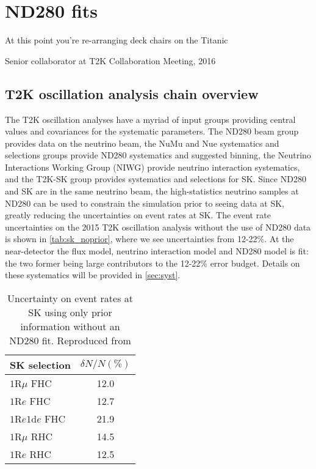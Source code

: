 \chapter{ND280 fits}
\label{chap:ND280}

\epigraph{At this point you're re-arranging deck chairs on the Titanic}{Senior collaborator at T2K Collaboration Meeting, 2016}

\section{T2K oscillation analysis chain overview}
\label{sec:oscchain}
The T2K oscillation analyses have a myriad of input groups providing central values and covariances for the systematic parameters. The ND280 beam group provides data on the neutrino beam, the NuMu and Nue systematics and selections groups provide ND280 systematics and suggested binning, the Neutrino Interactions Working Group (NIWG) provide neutrino interaction systematics, and the T2K-SK group provides systematics and selections for SK. Since ND280 and SK are in the same neutrino beam, the high-statistics neutrino samples at ND280 can be used to constrain the simulation prior to seeing data at SK, greatly reducing the uncertainties on event rates at SK. The event rate uncertainties on the 2015 T2K oscillation analysis without the use of ND280 data is shown in \autoref{tab:sk_noprior}, where we see uncertainties from 12-22\%. At the near-detector the flux model, neutrino interaction model and ND280 model is fit: the two former being large contributors to the 12-22\% error budget. Details on these systematics will be provided in \autoref{sec:syst}. 

\begin{table}[h]
	\begin{tabular}{l | c}
		\hline
		\hline
		SK selection & $\delta N/N (\%)$ \\
		\hline
		$1\text{R}\mu$ FHC & 12.0 \\
		$1\text{R}e$ FHC & 12.7 \\
		$1\text{R}e1\text{d}e$ FHC & 21.9 \\
		\hline
		$1\text{R}\mu$ RHC & 14.5 \\
		$1\text{R}e$ RHC & 12.5 \\
		\hline
		\hline
	\end{tabular}
	\caption{Uncertainty on event rates at SK using only prior information without an ND280 fit. Reproduced from \cite{t2k_2015}}
	\label{tab:sk_noprior}
\end{table}

